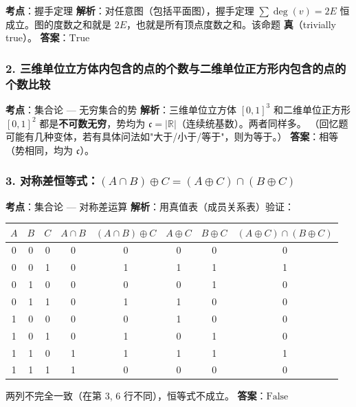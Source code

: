 \documentclass[10pt,a4paper,openany]{ctexbook}
\theoremstyle{definition}
\theoremstyle{remark}
\begin{document}
\textbf{考点}：握手定理
\textbf{解析}：对任意图（包括平面图），握手定理 $\sum \deg(v) = 2E$ 恒成立。图的度数之和就是 $2E$，也就是所有顶点度数之和。该命题 \textbf{真}（trivially true）。
\textbf{答案}：$\boxed{\text{True}}$
\vspace{-2pt}

\subsubsection{2. 三维单位立方体内包含的点的个数与二维单位正方形内包含的点的个数比较}

\textbf{考点}：集合论 — 无穷集合的势
\textbf{解析}：三维单位立方体 $[0,1]^3$ 和二维单位正方形 $[0,1]^2$ 都是\textbf{不可数无穷}，势均为 $\mathfrak{c} = |\mathbb{R}|$（连续统基数）。两者同样多。
（回忆题可能有几种变体，若有具体问法如"大于/小于/等于"，则为等于。）
\textbf{答案}：$\boxed{\text{相等}}$（势相同，均为 $\mathfrak{c}$）。
\vspace{-2pt}

\subsubsection{3. 对称差恒等式：$(A \cap B) \oplus C = (A \oplus C) \cap (B \oplus C)$}

\textbf{考点}：集合论 — 对称差运算
\textbf{解析}：用真值表（成员关系表）验证：
\begin{center}
\begin{tabular}{cccccccc}
\hline
$A$ & $B$ & $C$ & $A \cap B$ & $(A \cap B) \oplus C$ & $A \oplus C$ & $B \oplus C$ & $(A \oplus C) \cap (B \oplus C)$ \\ \hline
0 & 0 & 0 & 0 & 0 & 0 & 0 & 0 \\
0 & 0 & 1 & 0 & 1 & 1 & 1 & 1 \\
0 & 1 & 0 & 0 & 0 & 0 & 1 & 0 \\
0 & 1 & 1 & 0 & 1 & 1 & 0 & 0 \\
1 & 0 & 0 & 0 & 0 & 1 & 0 & 0 \\
1 & 0 & 1 & 0 & 1 & 0 & 1 & 0 \\
1 & 1 & 0 & 1 & 1 & 1 & 1 & 1 \\
1 & 1 & 1 & 1 & 0 & 0 & 0 & 0 \\
\hline
\end{tabular}

\end{center}

两列不完全一致（在第 3, 6 行不同），恒等式不成立。
\textbf{答案}：$\boxed{\text{False}}$
\vspace{-2pt}
\end{document}
